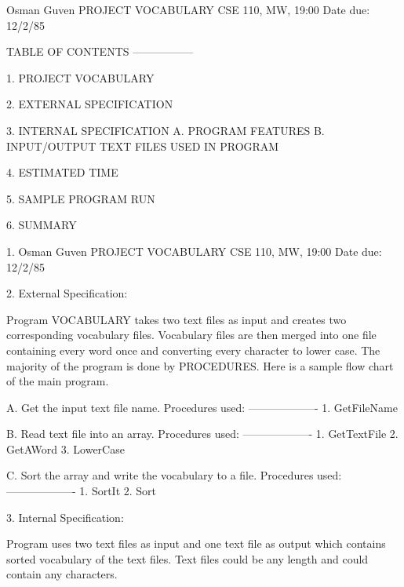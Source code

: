 

                                                     Osman Guven
                                                     PROJECT VOCABULARY
                                                     CSE 110, MW, 19:00
                                                     Date due: 12/2/85 




                    TABLE OF CONTENTS
                    -----------------

                    1. PROJECT VOCABULARY

                    2. EXTERNAL SPECIFICATION

                    3. INTERNAL SPECIFICATION
                       A. PROGRAM FEATURES
                       B. INPUT/OUTPUT TEXT FILES USED IN PROGRAM

                    4. ESTIMATED TIME

                    5. SAMPLE PROGRAM RUN
          
                    6. SUMMARY



1. Osman Guven
   PROJECT VOCABULARY
   CSE 110, MW, 19:00
   Date due: 12/2/85

2. External Specification:

        Program VOCABULARY takes two text files as input and
   creates two corresponding vocabulary files. Vocabulary files
   are then merged into one file containing every word once and
   converting every character to lower case.
        The majority of the program is done by PROCEDURES. Here
   is a sample flow chart of the main program.

         A.  Get the input text 
             file name.
             Procedures used:
             -------------------
             1. GetFileName

         B.  Read text file into
             an array.
             Procedures used:
             -------------------
             1. GetTextFile
             2. GetAWord
             3. LowerCase
  
         C.  Sort the array and
             write the vocabulary
             to a file.
             Procedures used:
             -------------------
             1. SortIt
             2. Sort

3. Internal Specification:

        Program uses two text files as input and one text file
   as output which contains sorted vocabulary of the text files.
   Text files could be any length and could contain any characters.

